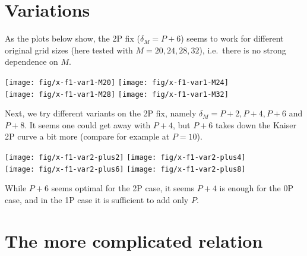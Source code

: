\documentclass[a4paper,10pt]{article}
\begin{document}
\section{Variations}

As the plots below show, the 2P fix ($\delta_M = P+6$) seems to
work for different original grid sizes (here tested with $M = 20,
24, 28, 32$), i.e.\ there is no strong dependence on $M$.

{\noindent\centering
\texttt{[image: fig/x-f1-var1-M20]}%
\texttt{[image: fig/x-f1-var1-M24]}\\%
\texttt{[image: fig/x-f1-var1-M28]}%
\texttt{[image: fig/x-f1-var1-M32]}}

Next, we try different variants on the 2P fix, namely $\delta_M =
P+2, P+4, P+6$ and $P+8$. It seems one could get away with $P+4$,
but $P+6$ takes down the Kaiser 2P curve a bit more (compare for
example at $P=10$).

{\noindent\centering
\texttt{[image: fig/x-f1-var2-plus2]}%
\texttt{[image: fig/x-f1-var2-plus4]}\\%
\texttt{[image: fig/x-f1-var2-plus6]}%
\texttt{[image: fig/x-f1-var2-plus8]}}

While $P+6$ seems optimal for the 2P case, it seems $P+4$ is
enough for the 0P case, and in the 1P case it is sufficient to
add only $P$.

\section{The more complicated relation}
\end{document}
